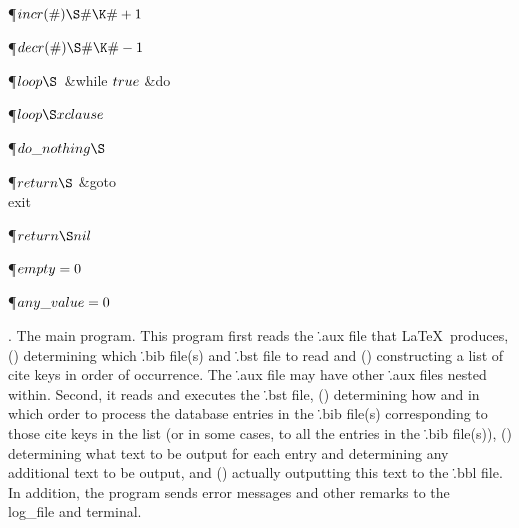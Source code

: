 \Y\P\D {}$\\{incr}(\#)\S\#\K\#+1$\par
\P\D {}$\\{decr}(\#)\S\#\K\#-1$\par
\P\D {}$\\{loop}\S$\ \&{while} $\\{true}$ \1\&{do}\ \par
\P\F {}$\\{loop}\S\\{xclause}$\par
\P\D {}$\\{do\_nothing}\S$\par
\P\D {}$\\{return}\S$\1\5
\&{goto} \\{exit}\2\par
\P\F {}$\\{return}\S\\{nil}$\par
\P\D {}$\\{empty}=0$\par
\P\D {}$\\{any\_value}=0$%
\par
\fi

.  The main program.
This program first reads the \.{.aux} file that \LaTeX\ produces,
() determining which \.{.bib} file(s) and \.{.bst} file
to read and () constructing a list of cite keys in order
of occurrence.  The \.{.aux} file may have other \.{.aux} files nested
within.  Second, it reads and executes the \.{.bst} file,
() determining how and in which order to process the
database entries in the \.{.bib} file(s) corresponding to those cite
keys in the list (or in some cases, to all the entries in the \.{.bib}
file(s)), () determining what text to be output for each
entry and determining any additional text to be output, and
() actually outputting this text to the \.{.bbl} file.
In addition, the program sends error messages and other remarks to the
\\{log\_file} and terminal.


